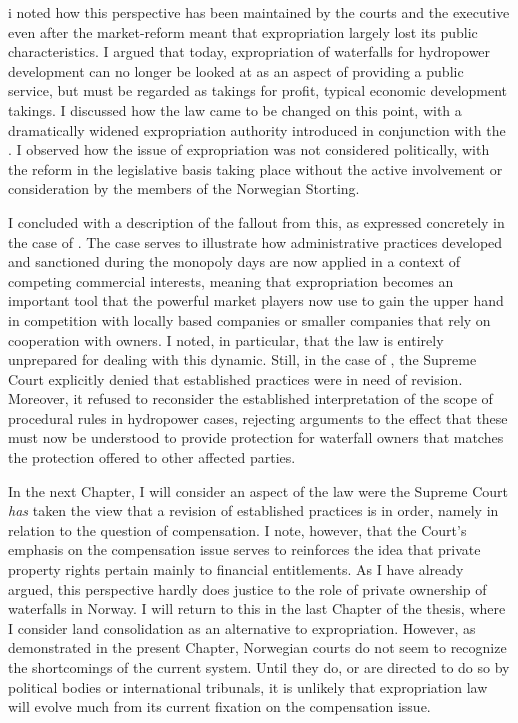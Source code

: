 i noted how this perspective has been maintained by the courts and the executive even after the market-reform meant that expropriation largely lost its public characteristics. I argued that today, expropriation of waterfalls for hydropower development can no longer be looked at as an aspect of providing a public service, but must be regarded as takings for profit, typical economic development takings. I discussed how the law came to be changed on this point, with a dramatically widened expropriation authority introduced in conjunction with the \cite{wra00}. I observed how the issue of expropriation was not considered politically, with the reform in the legislative basis taking place without the active involvement or consideration by the members of the Norwegian Storting.

I concluded with a description of the fallout from this, as expressed concretely in the case of \cite{måland11}. The case serves to illustrate how administrative practices developed and sanctioned during the monopoly days are now applied in a context of competing commercial interests, meaning that expropriation becomes an important tool that the powerful market players now use to gain the upper hand in competition with locally based companies or smaller companies that rely on cooperation with owners. I noted, in particular, that the law is entirely unprepared for dealing with this dynamic. Still, in the case of \cite{måland11}, the Supreme Court explicitly denied that established practices were in need of revision. Moreover, it refused to reconsider the established interpretation of the scope of procedural rules in hydropower cases, rejecting arguments to the effect that these must now be understood to provide protection for waterfall owners that matches the protection offered to other affected parties.

In the next Chapter, I will consider an aspect of the law were the Supreme Court {\it has} taken the view that a revision of established practices is in order, namely in relation to the question of compensation. I note, however, that the Court's emphasis on the compensation issue serves to reinforces the idea that private property rights pertain mainly to financial entitlements. As I have already argued, this perspective hardly does justice to the role of private ownership of waterfalls in Norway. I will return to this in the last Chapter of the thesis, where I consider land consolidation as an alternative to expropriation. However, as demonstrated in the present Chapter, Norwegian courts do not seem to recognize the shortcomings of the current system. Until they do, or are directed to do so by political bodies or international tribunals, it is unlikely that expropriation law will evolve much from its current fixation on the compensation issue. 






